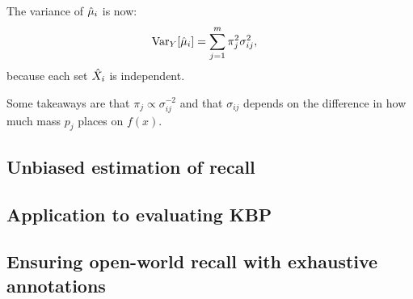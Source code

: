 The variance of ${\hat{\mu}}_i$ is now:
\begin{align*}
  \operatorname{Var}_{Y}[{\hat{\mu}}_i]
  &= \sum_{j=1}^m \pi_j^2 \sigma_{ij}^2,
\end{align*}
because each set ${\hat{X}}_i$ is independent.

Some takeaways are that $\pi_{j} \propto \sigma_{ij}^{-2}$ and that $\sigma_{ij}$ depends on the difference in how much mass $p_j$ places on $f(x)$.



\subsection{Unbiased estimation of recall}

\subsection{Application to evaluating KBP}




\subsection{Ensuring open-world recall with exhaustive annotations}

